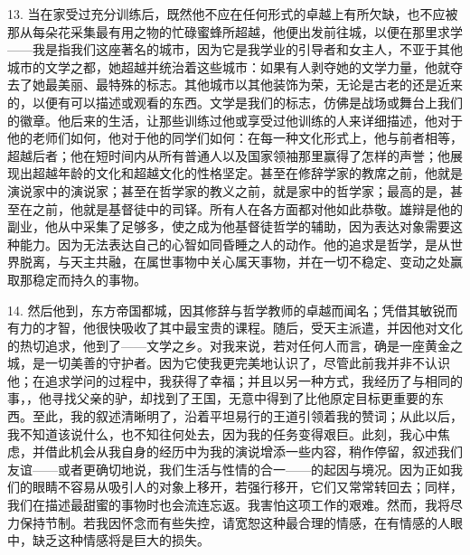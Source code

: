 13. 当在家受过充分训练后，既然他不应在任何形式的卓越上有所欠缺，也不应被那从每朵花采集最有用之物的忙碌蜜蜂所超越，他便出发前往城，以便在那里求学——我是指我们这座著名的城市，因为它是我学业的引导者和女主人，不亚于其他城市的文学之都，她超越并统治着这些城市：如果有人剥夺她的文学力量，他就夺去了她最美丽、最特殊的标志。其他城市以其他装饰为荣，无论是古老的还是近来的，以便有可以描述或观看的东西。文学是我们的标志，仿佛是战场或舞台上我们的徽章。他后来的生活，让那些训练过他或享受过他训练的人来详细描述，他对于他的老师们如何，他对于他的同学们如何：在每一种文化形式上，他与前者相等，超越后者；他在短时间内从所有普通人以及国家领袖那里赢得了怎样的声誉；他展现出超越年龄的文化和超越文化的性格坚定。甚至在修辞学家的教席之前，他就是演说家中的演说家；甚至在哲学家的教义之前，就是家中的哲学家；最高的是，甚至在之前，他就是基督徒中的司铎。所有人在各方面都对他如此恭敬。雄辩是他的副业，他从中采集了足够多，使之成为他基督徒哲学的辅助，因为表达对象需要这种能力。因为无法表达自己的心智如同昏睡之人的动作。他的追求是哲学，是从世界脱离，与天主共融，在属世事物中关心属天事物，并在一切不稳定、变动之处赢取那稳定而持久的事物。\par

14. 然后他到，东方帝国都城，因其修辞与哲学教师的卓越而闻名；凭借其敏锐而有力的才智，他很快吸收了其中最宝贵的课程。随后，受天主派遣，并因他对文化的热切追求，他到了——文学之乡。对我来说，若对任何人而言，确是一座黄金之城，是一切美善的守护者。因为它使我更完美地认识了，尽管此前我并非不认识他；在追求学问的过程中，我获得了幸福；并且以另一种方式，我经历了与相同的事，，他寻找父亲的驴，却找到了王国，无意中得到了比他原定目标更重要的东西。至此，我的叙述清晰明了，沿着平坦易行的王道引领着我的赞词；从此以后，我不知道该说什么，也不知往何处去，因为我的任务变得艰巨。此刻，我心中焦虑，并借此机会从我自身的经历中为我的演说增添一些内容，稍作停留，叙述我们友谊——或者更确切地说，我们生活与性情的合一——的起因与境况。因为正如我们的眼睛不容易从吸引人的对象上移开，若强行移开，它们又常常转回去；同样，我们在描述最甜蜜的事物时也会流连忘返。我害怕这项工作的艰难。然而，我将尽力保持节制。若我因怀念而有些失控，请宽恕这种最合理的情感，在有情感的人眼中，缺乏这种情感将是巨大的损失。\par

